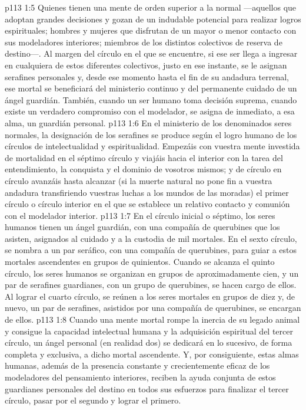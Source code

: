 \vs p113 1:5 Quienes tienen una mente de orden superior a la normal ---aquellos que adoptan grandes decisiones y gozan de un indudable potencial para realizar logros espirituales; hombres y mujeres que disfrutan de un mayor o menor contacto con sus modeladores interiores; miembros de los distintos colectivos de reserva de destino---. Al margen del círculo en el que se encuentre, si ese ser llega a ingresar en cualquiera de estos diferentes colectivos, justo en ese instante, se le asignan serafines personales y, desde ese momento hasta el fin de su andadura terrenal, ese mortal se beneficiará del ministerio continuo y del permanente cuidado de un ángel guardián. También, cuando un ser humano toma  decisión suprema, cuando existe un verdadero compromiso con el modelador, se asigna de inmediato, a esa alma, un guardián personal.
\vs p113 1:6 \pc En el ministerio de los denominados seres normales, la designación de los serafines se produce según el logro humano de los círculos de intelectualidad y espiritualidad. Empezáis con vuestra mente investida de mortalidad en el séptimo círculo y viajáis hacia el interior con la tarea del entendimiento, la conquista y el dominio de vosotros mismos; y de círculo en círculo avanzáis hasta alcanzar (si la muerte natural no pone fin a vuestra andadura transfiriendo vuestras luchas a los mundos de las moradas) el primer círculo o círculo interior en el que se establece un relativo contacto y comunión con el modelador interior.
\vs p113 1:7 En el círculo inicial o séptimo, los seres humanos tienen un ángel guardián, con una compañía de querubines que los asisten, asignados al cuidado y a la custodia de mil mortales. En el sexto círculo, se nombra a un par seráfico, con una compañía de querubines, para guiar a estos mortales ascendentes en grupos de quinientos. Cuando se alcanza el quinto círculo, los seres humanos se organizan en grupos de aproximadamente cien, y un par de serafines guardianes, con un grupo de querubines, se hacen cargo de ellos. Al lograr el cuarto círculo, se reúnen a los seres mortales en grupos de diez y, de nuevo, un par de serafines, asistidos por una compañía de querubines, se encargan de ellos.
\vs p113 1:8 Cuando una mente mortal rompe la inercia de su legado animal y consigue la capacidad intelectual humana y la adquisición espiritual del tercer círculo, un ángel personal (en realidad dos) se dedicará en lo sucesivo, de forma completa y exclusiva, a dicho mortal ascendente. Y, por consiguiente, estas almas humanas, además de la presencia constante y crecientemente eficaz de los modeladores del pensamiento interiores, reciben la ayuda conjunta de estos guardianes personales del destino en todos sus esfuerzos para finalizar el tercer círculo, pasar por el segundo y lograr el primero.

